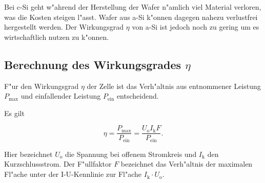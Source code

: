 		Bei c-Si geht w"ahrend der Herstellung der Wafer n"amlich viel Material verloren, was die Kosten steigen l"asst.
		Wafer aus a-Si k"onnen dagegen nahezu verlustfrei hergestellt werden.
		Der Wirkungsgrad $\eta$ von a-Si ist jedoch noch zu gering um es wirtschaftlich nutzen zu k"onnen.

	\subsection{Berechnung des Wirkungsgrades $\eta$}
		\label{subsec:wirkungsgrad}
		F"ur den Wirkungsgrad $\eta$ der Zelle ist das Verh"altnis aus entnommener Leistung $P_\mathrm{max}$ und einfallender Leistung $P_\mathrm{ein}$ entscheidend.

		Es gilt

		\begin{equation}
			\eta = \frac{P_\mathrm{max}}{P_\mathrm{ein}} = \frac{U_\mathrm{o} I_\mathrm{k} F}{P_\mathrm{ein}} .
		\end{equation}

		Hier bezeichnet $U_\mathrm{o}$ die Spannung bei offenem Stromkreis und $I_\mathrm{k}$ den Kurzschlussstrom. Der F"ullfaktor $F$ bezeichnet das Verh"altnis der maximalen Fl"ache unter der I-U-Kennlinie zur Fl"ache $I_\mathrm{k} \cdot U_\mathrm{o}$.
